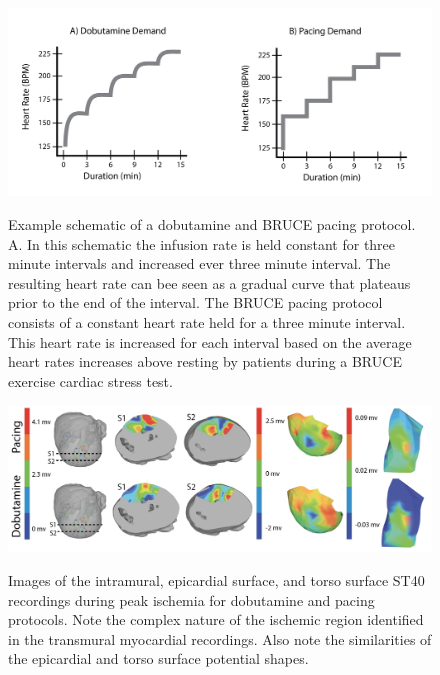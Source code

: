 \begin{figure}[htb]%
	\begin{center}
		{\includegraphics[width=\textwidth]
			{../Figures/DobutvsPacingProtocol.png}}
		\captionsetup{width = \textwidth}
		\caption{\small \label{fig:dobutvspacingprotocol} Example schematic of a dobutamine and BRUCE pacing protocol. A. In this schematic the infusion rate is held constant for three minute intervals and increased ever three minute interval. The resulting heart rate can bee seen as a gradual curve that plateaus prior to the end of the interval. The BRUCE pacing protocol consists of a constant heart rate held for a three minute interval. This heart rate is increased for each interval based on the average heart rates increases above resting by patients during a BRUCE exercise cardiac stress test.}
	\end{center}
\end{figure}


\begin{figure}[htb]%
    \begin{center}
        {\includegraphics[width=\textwidth]
          {../Figures/fig2.png}}
        \captionsetup{width = \textwidth}
        \caption{\small \label{fig:dobutvspacing} Images of the
          intramural, epicardial surface, and torso surface ST40 recordings
          during peak ischemia for dobutamine and pacing protocols. Note the complex nature of the ischemic region identified in the transmural myocardial recordings. Also note the similarities of the epicardial and torso surface potential shapes. }
    \end{center}
\end{figure}


